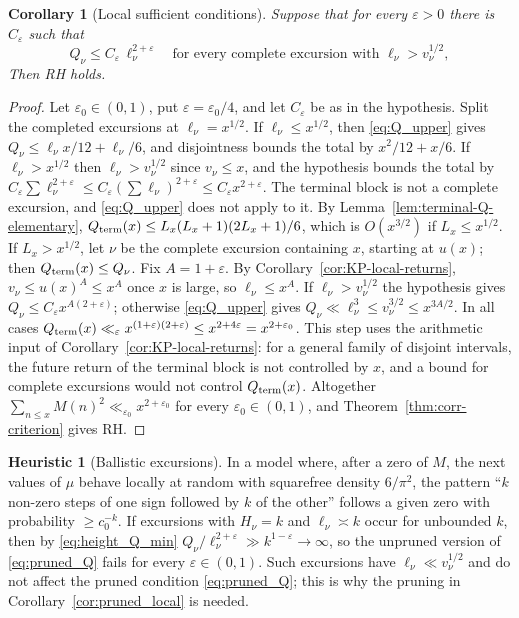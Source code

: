 \documentclass[11pt]{amsart}
\numberwithin{equation}{section}
\theoremstyle{plain}
\newtheorem{corollary}[theorem]{Corollary}
\theoremstyle{definition}
\newtheorem{heuristic}[theorem]{Heuristic}
\theoremstyle{remark}
\newcommand{\eps}{\varepsilon}
\begin{document}
\begin{corollary}[Local sufficient conditions]
\label{cor:local-corr-sufficient}
\label{cor:pruned_local}
Suppose that for every $\eps>0$ there is $C_\eps$ such that
\begin{equation}
\label{eq:pruned_Q}
  Q_\nu\le C_\eps\,\ell_\nu^{2+\eps}\quad\text{for every complete excursion with }
  \ell_\nu>v_\nu^{1/2},
\end{equation}
Then RH holds.
\end{corollary}

\begin{proof}
Let $\eps_0\in(0,1)$, put $\eps=\eps_0/4$, and let $C_\eps$ be as in the
hypothesis. Split the completed excursions at $\ell_\nu=x^{1/2}$. If
$\ell_\nu\le x^{1/2}$, then \eqref{eq:Q_upper} gives
$Q_\nu\le\ell_\nu x/12+\ell_\nu/6$, and disjointness bounds the total by
$x^2/12+x/6$. If $\ell_\nu>x^{1/2}$ then $\ell_\nu>v_\nu^{1/2}$ since
$v_\nu\le x$, and the hypothesis bounds the total by
$C_\eps\sum\ell_\nu^{2+\eps}\le C_\eps(\sum\ell_\nu)^{2+\eps}\le C_\eps x^{2+\eps}$.
The terminal block is not a complete excursion, and \eqref{eq:Q_upper} does
not apply to it. By Lemma~\ref{lem:terminal-Q-elementary},
$Q_{\rm term}(x)\le L_x(L_x+1)(2L_x+1)/6$, which is $O(x^{3/2})$ if $L_x\le x^{1/2}$. If $L_x>x^{1/2}$, let $\nu$ be the
complete excursion containing $x$, starting at $u(x)$; then
$Q_{\rm term}(x)\le Q_\nu$. Fix $A=1+\eps$. By
Corollary~\ref{cor:KP-local-returns}, $v_\nu\le u(x)^A\le x^A$ once $x$ is
large, so $\ell_\nu\le x^A$. If $\ell_\nu>v_\nu^{1/2}$ the hypothesis gives
$Q_\nu\le C_\eps x^{A(2+\eps)}$; otherwise \eqref{eq:Q_upper} gives
$Q_\nu\ll\ell_\nu^3\le v_\nu^{3/2}\le x^{3A/2}$. In all cases
$Q_{\rm term}(x)\ll_\eps x^{(1+\eps)(2+\eps)}\le x^{2+4\eps}=x^{2+\eps_0}$. This step uses the arithmetic
input of Corollary~\ref{cor:KP-local-returns}: for a general family of
disjoint intervals, the future return of the terminal block is not
controlled by $x$, and a bound for complete excursions would not control
$Q_{\rm term}(x)$. Altogether
$\sum_{n\le x}M(n)^2\ll_{\eps_0}x^{2+\eps_0}$ for every $\eps_0\in(0,1)$,
and Theorem~\ref{thm:corr-criterion} gives RH.
\end{proof}

\begin{heuristic}[Ballistic excursions]
\label{heu:local_fails}
In a model where, after a zero of $M$, the next values of $\mu$ behave
locally at random with squarefree density $6/\pi^2$, the pattern ``$k$
non-zero steps of one sign followed by $k$ of the other'' follows a given
zero with probability $\ge c_0^{-k}$. If excursions with $H_\nu=k$ and
$\ell_\nu\asymp k$ occur for unbounded $k$, then by \eqref{eq:height_Q_min}
$Q_\nu/\ell_\nu^{2+\eps}\gg k^{1-\eps}\to\infty$, so the unpruned version of
\eqref{eq:pruned_Q} fails for every $\eps\in(0,1)$. Such excursions have
$\ell_\nu\ll v_\nu^{1/2}$ and do not affect the pruned condition
\eqref{eq:pruned_Q}; this is why the pruning in
Corollary~\ref{cor:pruned_local} is needed.
\end{heuristic}
\end{document}
